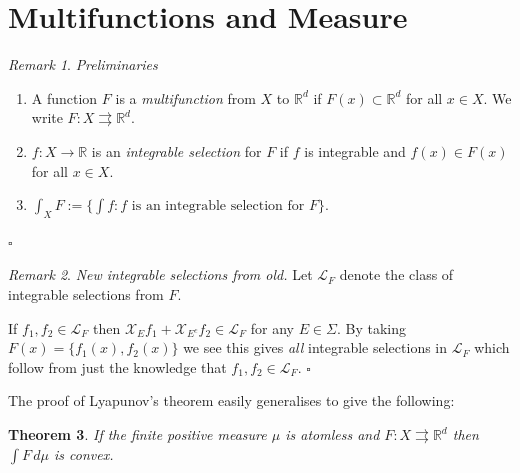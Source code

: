 \documentclass[a4paper]{amsart}
\theoremstyle{plain}
\newtheorem{theorem}{Theorem}[section]
\theoremstyle{definition}
\theoremstyle{remark}
\newtheorem{remark}[theorem]{Remark}
\begin{document}
 

\section{\textbf{Multifunctions and Measure}}

 
\begin{remark} \emph{Preliminaries}
\begin{enumerate}
\item A function $ F $ is a \emph{multifunction} from $ X $ to $ \mathbb{R}^d  $ if $ F(x) \subset \mathbb{R}^d  $ for all $ x \in X $.
We write $  F:X \rightrightarrows \mathbb{R}^d $.

\item $ f:X \to \mathbb{R} $ is an \emph{integrable selection} for  $ F $ if $ f $ is integrable and $ f(x) \in F(x) $ for all $ x\in X $.
 
\item $ \int_X F := \{ \int f : f \text{ is an integrable selection for } F \}$. 
\end{enumerate}
\hfill $\square$  \end{remark}

 
\begin{remark} \label{nfo}  \emph{New integrable selections from old.}  Let $ \mathcal{L} _F $ denote the class of integrable selections from $ F $.  

If $ f_1, f_2 \in \mathcal{L} _F $ then $ \mathcal{X} _E f_1 + \mathcal{X} _{E^c} f_2 \in  \mathcal{L} _F $ for any $ E \in \Sigma $.
By taking $ F(x) = \{ f_1(x), f_2(x) \} $ we see this gives \emph{all} integrable selections in $ \mathcal{L} _F $ which follow from just the knowledge that $ f_1, f_2 \in \mathcal{L} _F $.
\hfill $\square$  \end{remark}  
 
The proof of Lyapunov's theorem easily generalises to give the following:
 
\begin{theorem}\label{mfs}
  If the finite positive  measure $ \mu $ is atomless and $  F :X\rightrightarrows \mathbb{R}^d $ then $ \int F\, d\mu  $ is convex.
 \end{theorem} 
 
\end{document}
